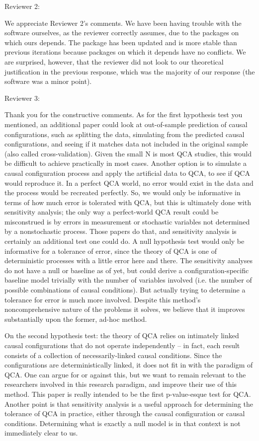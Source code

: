 \documentclass[12pt,stdletter,dateno,sigleft]{newlfm} %
\begin{document}
\begin{newlfm}
Reviewer 2: 

We appreciate Reviewer 2's comments. We have been having trouble with the software ourselves, as the reviewer correctly assumes, due to the packages on which ours depends. The package has been updated and is more stable than previous iterations because packages on which it depends have no conflicts. We are surprised, however, that the reviewer did not look to our theoretical justification in the previous response, which was the majority of our response (the software was a minor point). \newline


Reviewer 3: 

Thank you for the constructive comments. As for the first hypothesis test you mentioned, an additional paper could look at out-of-sample prediction of causal configurations, such as splitting the data, simulating from the predicted causal configurations, and seeing if it matches data not included in the original sample (also called cross-validation). Given the small N is most QCA studies, this would be difficult to achieve practically in most cases. Another option is to simulate a causal configuration process and apply the artificial data to QCA, to see if QCA would reproduce it. In a perfect QCA world, no error would exist in the data and the process would be recreated perfectly. So, we would only be informative in terms of how much error is tolerated with QCA, but this is ultimately done with sensitivity analysis; the only way a perfect-world QCA result could be misconstrued is by errors in measurement or stochastic variables not determined by a nonstochastic process. Those papers do that, and sensitivity analysis is certainly an additional test one could do. A null hypothesis test would only be informative for a tolerance of error, since the theory of QCA is one of deterministic processes with a little error here and there. The sensitivity analyses do not have a null or baseline as of yet, but could derive a configuration-specific baseline model trivially with the number of variables involved (i.e. the number of possible combinations of causal conditions). But actually trying to determine a tolerance for error is much more involved. Despite this method's noncomprehensive nature of the problems it solves, we believe that it improves substantially upon the former, ad-hoc method.

On the second hypothesis test: the theory of QCA relies on intimately linked causal configurations that do not operate independently -- in fact, each result consists of a collection of necessarily-linked causal conditions. Since the configurations are deterministically linked, it does not fit in with the paradigm of QCA. One can argue for or against this, but we want to remain relevant to the researchers involved in this research paradigm, and improve their use of this method. This paper is really intended to be the first p-value-esque test for QCA. Another point is that sensitivity analysis is a useful approach for determining the tolerance of QCA in practice, either through the causal configuration or causal conditions. Determining what is exactly a null model is in that context is not immediately clear to us. 


\end{newlfm}
\end{document}
